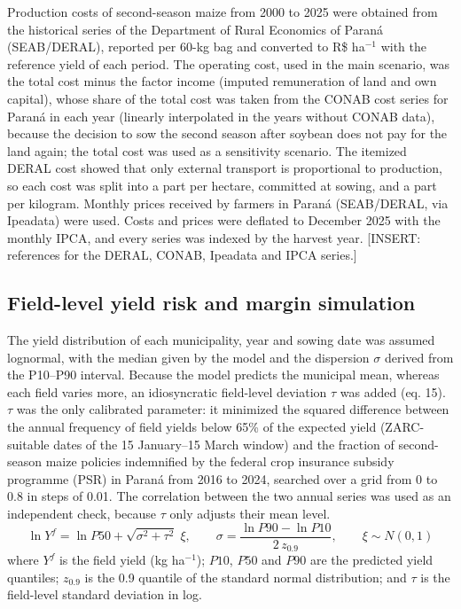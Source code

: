 \documentclass[10pt,a4paper]{article}
\begin{document}
Production costs of second-season maize from 2000 to 2025 were obtained from the historical series of
the Department of Rural Economics of Paraná (SEAB/DERAL), reported per 60-kg bag and converted to
R\$ ha$^{-1}$ with the reference yield of each period. The operating cost, used in the main scenario,
was the total cost minus the factor income (imputed remuneration of land and own capital), whose share
of the total cost was taken from the CONAB cost series for Paraná in each year (linearly interpolated
in the years without CONAB data), because the decision to
sow the second season after soybean does not pay for the land again; the total cost was used as a
sensitivity scenario. The itemized DERAL cost showed that only external transport is proportional to
production, so each cost was split into a part per hectare, committed at sowing, and a part per kilogram.
Monthly prices received by farmers in Paraná (SEAB/DERAL, via Ipeadata) were used. Costs and prices were
deflated to December 2025 with the monthly IPCA, and every series was indexed by the harvest year.
[INSERT: references for the DERAL, CONAB, Ipeadata and IPCA series.]

\subsection{Field-level yield risk and margin simulation}
\label{subsec:margin}

The yield distribution of each municipality, year and sowing date was assumed lognormal, with the median
given by the model and the dispersion $\sigma$ derived from the P10--P90 interval. Because the model
predicts the municipal mean, whereas each field varies more, an idiosyncratic field-level deviation
$\tau$ was added (eq. 15). $\tau$ was the only calibrated parameter: it minimized the squared difference
between the annual frequency of field yields below 65\% of the expected yield (ZARC-suitable dates of
the 15 January--15 March window) and the fraction of second-season maize policies indemnified by the
federal crop insurance subsidy programme (PSR) in Paraná from 2016 to 2024, searched over a grid from 0
to 0.8 in steps of 0.01. The correlation between the
two annual series was used as an independent check, because $\tau$ only adjusts their mean level.
\begin{equation}
\ln Y^{f} = \ln P50 + \sqrt{\sigma^2 + \tau^2}\;\xi, \qquad
\sigma = \frac{\ln P90 - \ln P10}{2\,z_{0.9}}, \qquad \xi \sim N(0,1)
\label{eq:field}
\end{equation}
where $Y^{f}$ is the field yield (kg ha$^{-1}$); $P10$, $P50$ and $P90$ are the predicted yield
quantiles; $z_{0.9}$ is the 0.9 quantile of the standard normal distribution; and $\tau$ is the
field-level standard deviation in log.
\end{document}
